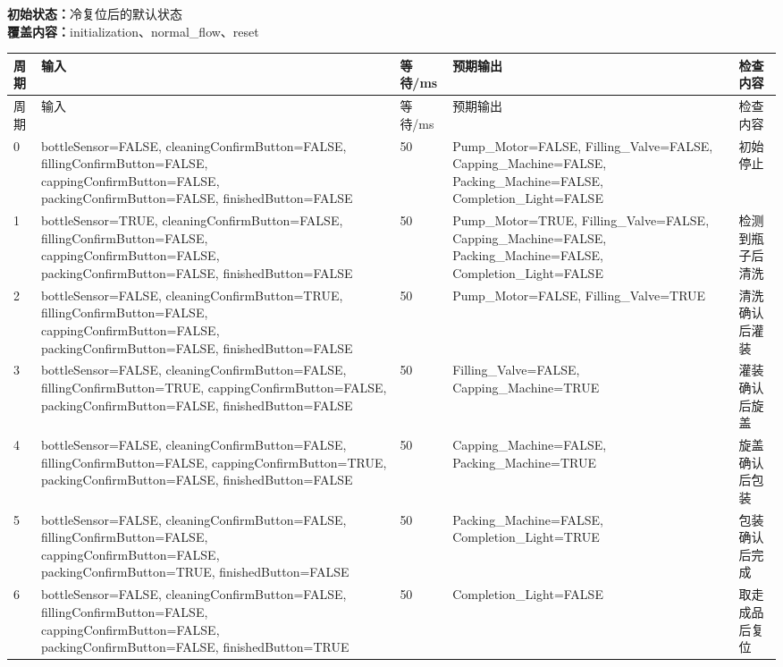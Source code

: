 \noindent\textbf{初始状态：}冷复位后的默认状态\\

\textbf{覆盖内容：}initialization、normal\_flow、reset

\begin{longtable}{L{1.0cm}L{4.7cm}L{1.4cm}L{4.0cm}L{2.1cm}}

\toprule

周期 & 输入 & 等待/ms & 预期输出 & 检查内容\\

\midrule

\endfirsthead

\toprule

周期 & 输入 & 等待/ms & 预期输出 & 检查内容\\

\midrule

\endhead

0 & bottleSensor=FALSE, cleaningConfirmButton=FALSE, fillingConfirmButton=FALSE, cappingConfirmButton=FALSE, packingConfirmButton=FALSE, finishedButton=FALSE & 50 & Pump\_Motor=FALSE, Filling\_Valve=FALSE, Capping\_Machine=FALSE, Packing\_Machine=FALSE, Completion\_Light=FALSE & 初始停止\\

1 & bottleSensor=TRUE, cleaningConfirmButton=FALSE, fillingConfirmButton=FALSE, cappingConfirmButton=FALSE, packingConfirmButton=FALSE, finishedButton=FALSE & 50 & Pump\_Motor=TRUE, Filling\_Valve=FALSE, Capping\_Machine=FALSE, Packing\_Machine=FALSE, Completion\_Light=FALSE & 检测到瓶子后清洗\\

2 & bottleSensor=FALSE, cleaningConfirmButton=TRUE, fillingConfirmButton=FALSE, cappingConfirmButton=FALSE, packingConfirmButton=FALSE, finishedButton=FALSE & 50 & Pump\_Motor=FALSE, Filling\_Valve=TRUE & 清洗确认后灌装\\

3 & bottleSensor=FALSE, cleaningConfirmButton=FALSE, fillingConfirmButton=TRUE, cappingConfirmButton=FALSE, packingConfirmButton=FALSE, finishedButton=FALSE & 50 & Filling\_Valve=FALSE, Capping\_Machine=TRUE & 灌装确认后旋盖\\

4 & bottleSensor=FALSE, cleaningConfirmButton=FALSE, fillingConfirmButton=FALSE, cappingConfirmButton=TRUE, packingConfirmButton=FALSE, finishedButton=FALSE & 50 & Capping\_Machine=FALSE, Packing\_Machine=TRUE & 旋盖确认后包装\\

5 & bottleSensor=FALSE, cleaningConfirmButton=FALSE, fillingConfirmButton=FALSE, cappingConfirmButton=FALSE, packingConfirmButton=TRUE, finishedButton=FALSE & 50 & Packing\_Machine=FALSE, Completion\_Light=TRUE & 包装确认后完成\\

6 & bottleSensor=FALSE, cleaningConfirmButton=FALSE, fillingConfirmButton=FALSE, cappingConfirmButton=FALSE, packingConfirmButton=FALSE, finishedButton=TRUE & 50 & Completion\_Light=FALSE & 取走成品后复位\\

\bottomrule

\end{longtable}

